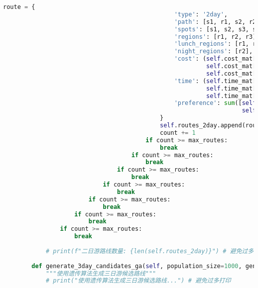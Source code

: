 \begin{lstlisting}[language=Python]
                                            route = {
                                                'type': '2day',
                                                'path': [s1, r1, s2, r2, s3, r3, s4],
                                                'spots': [s1, s2, s3, s4],
                                                'regions': [r1, r2, r3],
                                                'lunch_regions': [r1, r3],  # 第1天午餐r1，第2天午餐r3
                                                'night_regions': [r2],  # 第1天住宿r2
                                                'cost': (self.cost_mat[s1, r1] + self.cost_mat[s2, r1] + 
                                                         self.cost_mat[s2, r2] + self.cost_mat[s3, r2] + 
                                                         self.cost_mat[s3, r3] + self.cost_mat[s4, r3]),
                                                'time': (self.time_mat[s1, r1] + self.time_mat[s2, r1] + 
                                                         self.time_mat[s2, r2] + self.time_mat[s3, r2] + 
                                                         self.time_mat[s3, r3] + self.time_mat[s4, r3]),
                                                'preference': sum([self.region_prefer[r1], self.region_prefer[r2], 
                                                                   self.region_prefer[r3]]) + 4
                                            }
                                            self.routes_2day.append(route)
                                            count += 1
                                        if count >= max_routes:
                                            break
                                    if count >= max_routes:
                                        break
                                if count >= max_routes:
                                    break
                            if count >= max_routes:
                                break
                        if count >= max_routes:
                            break
                    if count >= max_routes:
                        break
                if count >= max_routes:
                    break
            
            # print(f"二日游路线数量: {len(self.routes_2day)}") # 避免过多打印
        
        def generate_3day_candidates_ga(self, population_size=1000, generations=50, candidate_size=5000):
            """使用遗传算法生成三日游候选路线"""
            # print("使用遗传算法生成三日游候选路线...") # 避免过多打印
            

\end{lstlisting}
